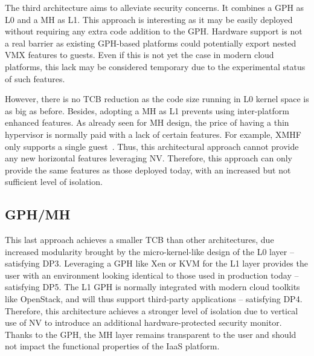 \documentclass{sig-alternate}
\begin{document}
\noindent The third architecture aims to alleviate security concerns. It combines a GPH as L0 and a MH as L1. 
This approach is interesting as it may be easily deployed without requiring any extra code addition to the GPH. Hardware support is not a real barrier as existing GPH-based platforms could potentially export nested VMX features to guests. Even if this is not yet the case in modern cloud platforms, this lack may be considered temporary due to the experimental status of such features.

However, there is no TCB reduction as the code size running in L0 kernel space is as big as before. 
Besides, adopting a MH as L1 prevents using inter-platform enhanced features. As already seen for MH design, the price of having a thin hypervisor is normally paid with a lack of certain features. For example, XMHF only supports a single guest~\cite{xmhf}. Thus, this architectural approach cannot provide any new horizontal features leveraging NV. Therefore, this approach can only provide the same features as those deployed today, with an increased but not sufficient level of isolation.

\subsection{GPH/MH}
\label{par:gom}

\noindent This last approach achieves a smaller TCB than other architectures, due increased modularity brought by the micro-kernel-like design of the L0 layer -- satisfying DP3. Leveraging a GPH like Xen or KVM for the L1 layer provides the user with an environment looking identical to those used in production today -- satisfying DP5. The L1 GPH is normally integrated with modern cloud toolkits like OpenStack, and will thus support third-party applications -- satisfying DP4.
Therefore, this architecture achieves a stronger level of isolation due to vertical use of NV to introduce an additional hardware-protected security monitor. Thanks to the GPH, the MH layer remains transparent to the user and should not impact the functional properties of the IaaS platform.
\end{document}
